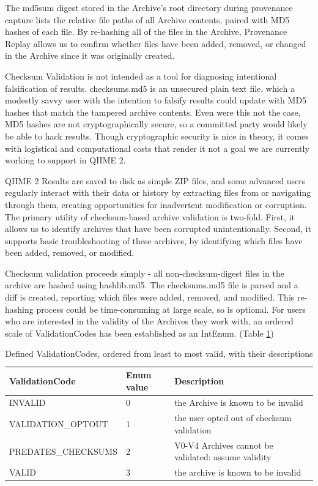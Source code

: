 The md5sum digest stored in the Archive’s root directory during provenance
capture lists the relative file paths of all Archive contents, paired with MD5
hashes of each file.  By re-hashing all of the files in the Archive, Provenance
Replay allows us to confirm whether files have been added, removed, or changed
in the Archive since it was originally created. 

Checksum Validation is not intended as a tool for diagnosing intentional
falsification of results. checksums.md5 is an unsecured plain text file, which a
modestly savvy user with the intention to falsify results could update with MD5
hashes that match the tampered archive contents. Even were this not the case,
MD5 hashes are not cryptographically secure, so a committed party would likely
be able to hack results. Though cryptographic security is nice in theory, it
comes with logistical and computational costs that render it not a goal we are
currently working to support in QIIME 2.

QIIME 2 Results are saved to disk as simple ZIP files, and some advanced users
regularly interact with their data or history by extracting files from or
navigating through them, creating opportunities for inadvertent modification or
corruption. The primary utility of checksum-based archive validation is
two-fold. First, it allows us to identify archives that have been corrupted
unintentionally. Second, it supports basic troubleshooting of these archives, by
identifying which files have been added, removed, or modified. 

Checksum validation proceeds simply - all non-checksum-digest files in the
archive are hashed using hashlib.md5. The checksums.md5 file is parsed and a
diff is created, reporting which files were added, removed, and modified. This
re-hashing process could be time-consuming at large scale, so is optional. For
users who are interested in the validity of the Archives they work with, an
ordered scale of ValidationCodes has been established as an IntEnum. (Table \ref{tab:validationCodes})

\begin{table}[htp]
    \centering
    \begin{tabular}{|p{}|p{}|p{}|}
    \hline
    ValidationCode      & Enum value & Description                                          \\ \hline
    INVALID             & 0          & the Archive is known to be invalid                   \\
    VALIDATION\_OPTOUT  & 1          & the user opted out of checksum validation            \\
    PREDATES\_CHECKSUMS & 2          & V0-V4 Archives cannot be validated: assume validity  \\
    VALID               & 3          & the archive is known to be invalid                   \\ \hline
    \end{tabular}
    \caption[Defined ValidationCodes, ordered from least to most valid, with their descriptions]%
    {Defined ValidationCodes, ordered from least to most valid, with their descriptions}
    \label{tab:validationCodes}
\end{table}

